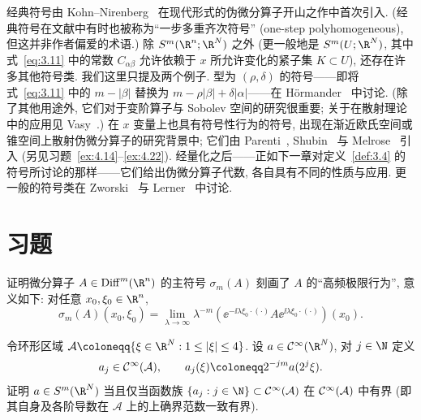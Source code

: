经典符号由 Kohn--Nirenberg~\cite{KN65} 在现代形式的伪微分算子开山之作中首次引入. (经典符号在文献中有时也被称为``一步多重齐次符号'' (one-step polyhomogeneous), 但这并非作者偏爱的术语.) 除 $S^m(\R^n; \R^N)$ 之外 (更一般地是 $S^m(U; \R^N)$, 其中式~\eqref{eq:3.11} 中的常数 $C_{\alpha\beta}$ 允许依赖于 $x$ 所允许变化的紧子集 $K \subset U$), 还存在许多其他符号类. 我们这里只提及两个例子. 型为 $(\rho, \delta)$ 的符号——即将式~\eqref{eq:3.11} 中的 $m - |\beta|$ 替换为 $m - \rho |\beta| + \delta |\alpha|$——在 Hörmander~\cite[定义 1.1.1]{Hor71a} 中讨论. (除了其他用途外, 它们对于变阶算子与 Sobolev 空间的研究很重要; 关于在散射理论中的应用见 Vasy~\cite{Vas18}.) 在 $x$ 变量上也具有符号性行为的符号, 出现在渐近欧氏空间或锥空间上散射伪微分算子的研究背景中; 它们由 Parenti~\cite{Par72}, Shubin~\cite{Shu71} 与 Melrose~\cite{Mel94} 引入 (另见习题~\ref{ex:4.14}--\ref{ex:4.22}). 经量化之后——正如下一章对定义~\ref{def:3.4} 的符号所讨论的那样——它们给出伪微分算子代数, 各自具有不同的性质与应用. 更一般的符号类在 Zworski~\cite{Zwo12} 与 Lerner~\cite{Ler10} 中讨论.

\section*{习题}

\begin{exer}[利用振荡检验法确定主符号]\label{ex:3.1}
证明微分算子 $A \in \Diff^m(\R^n)$ 的主符号 $\sigma_m(A)$ 刻画了 $A$ 的``高频极限行为'', 意义如下: 对任意 $x_0, \xi_0 \in \R^n$,
\begin{equation}\label{eq:3.63}
    \sigma_m(A)(x_0, \xi_0) = \lim_{\lambda \to \infty} \lambda^{-m} \left( \ee^{-\ii \lambda \xi_0 \cdot (\cdot)} A \ee^{\ii \lambda \xi_0 \cdot (\cdot)} \right)(x_0).
\end{equation}
\end{exer}

\begin{exer}[符号类的二进环形刻画]\label{ex:3.2}
令环形区域 $\mathcal{A} \defeq \{\xi \in \R^N : 1 \le |\xi| \le 4\}$. 设 $a \in \Smooth(\R^N)$, 对 $j \in \N$ 定义
\begin{equation}\label{eq:3.64}
    a_j \in \Smooth(\mathcal{A}), \qquad a_j(\xi) \defeq 2^{-j m} a(2^j \xi).
\end{equation}
证明 $a \in S^m(\R^N)$ 当且仅当函数族 $\{a_j : j \in \N\} \subset \Smooth(\mathcal{A})$ 在 $\mathcal{C}^\infty(\mathcal{A})$ 中有界 (即其自身及各阶导数在 $\mathcal{A}$ 上的上确界范数一致有界).
\end{exer}

